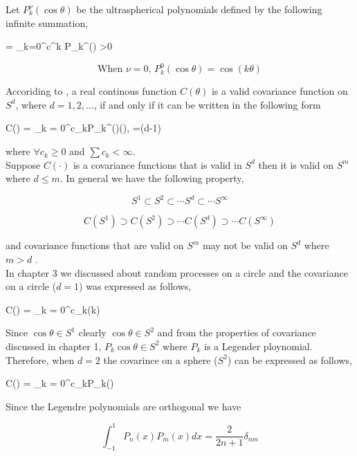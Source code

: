 Let $P_{k}^{\nu}(\cos\theta)$ be the ultraspherical polynomials defined by the following infinite summation,

\beq
   = \sum_{k=0}^{\infty}c^{k} P_{k}^{\nu}(\cos\theta) \quad \nu>0
\eeq


\[
\mbox{When $\nu = 0$, } P_{k}^{0}(\cos\theta) = \cos (k\theta)
\]

Accoriding to \cite{schoenberg1942}, a real continous function $C(\theta)$ is a valid covariance function on $S^d$, where $d=1,2,\ldots$, if and only if it can be written in the following form

\beq
C(\theta) = \sum_{k = 0}^\infty c_kP_k^{(\nu)}(\cos\theta), \quad \nu=(d-1)
\eeq

where $\forall c_k\ge 0$ and $\sum c_k < \infty$. \\

Suppose $C(\cdot)$ is a covariance functions that is valid in $S^d$ then it is valid on $S^m$ where $d\le m$. In general we have the following property,

\[
S^1 \subset S^2 \subset \cdots S^{d} \subset \cdots S^{\infty}
\]


\[
C(S^1) \supset C(S^2) \supset \cdots C(S^d) \supset \cdots C(S^{\infty})
\]

and covariance functions that are valid on $S^m$ may not be valid on $S^d$ where $m>d$ .\\

In chapter 3 we discussed about random processes on a circle and the covariance on a circle ($d=1$) was expressed as follows,

\beq
C(\theta) = \sum_{k = 0}^\infty c_k\cos (k\theta)
\eeq

Since $\cos\theta \in S^1$ clearly $\cos\theta \in S^2$ and from the properties of covariance discussed in chapter 1, $P_k\cos\theta \in S^2$ where $P_k$ is a Legender ploynomial. Therefore, when $d=2$ the covarince on a sphere ($S^2$) can be expressed as follows,

\beq \label{covs2_sum}
C(\theta) = \sum_{k = 0}^\infty c_kP_k(\cos\theta)
\eeq


Since the Legendre polynomials are orthogonal we have

\[
	\int_{-1}^{1} P_{n}(x)P_{m}(x)dx = \frac{2}{2n+1}\delta_{nm}
\]


